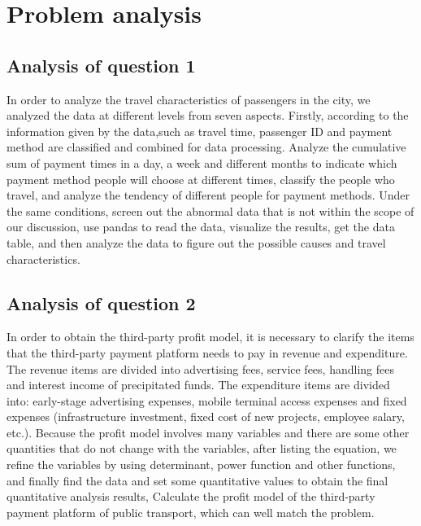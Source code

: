 \documentclass[../mcmpaper]{subfiles}
\begin{document}
\section{Problem analysis}
\subsection{Analysis of question 1}
In order to analyze the travel characteristics of passengers in the city, we analyzed the data at different levels from seven aspects. Firstly, according to the information given by the data,such as travel time, passenger ID and payment method are classified and combined for data processing. Analyze the cumulative sum of payment times in a day, a week and different months to indicate which payment method people will choose at different times, classify the people who travel, and analyze the tendency of different people for payment methods. Under the same conditions, screen out the abnormal data that is not within the scope of our discussion, use pandas to read the data, visualize the results, get the data table, and then analyze the data to figure out the possible causes and travel characteristics.
\subsection{Analysis of question 2}
In order to obtain the third-party profit model, it is necessary to clarify the items that the third-party payment platform needs to pay in revenue and expenditure. The revenue items are divided into advertising fees, service fees, handling fees and interest income of precipitated funds. The expenditure items are divided into: early-stage advertising expenses, mobile terminal access expenses and fixed expenses (infrastructure investment, fixed cost of new projects, employee salary, etc.). Because the profit model involves many variables and there are some other quantities that do not change with the variables, after listing the equation, we refine the variables by using determinant, power function and other functions, and finally find the data and set some quantitative values to obtain the final quantitative analysis results, Calculate the profit model of the third-party payment platform of public transport, which can well match the problem.
\end{document}
